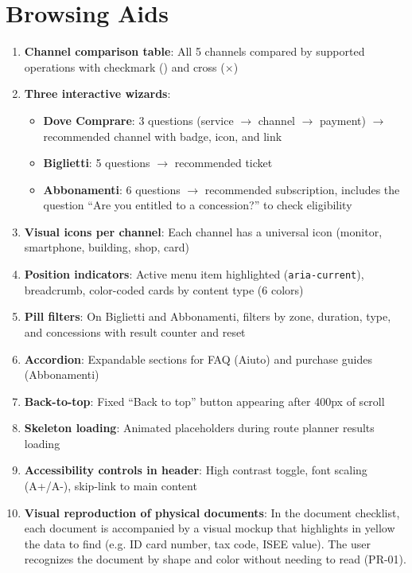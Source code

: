 ﻿\documentclass[11pt,a4paper]{article}
\begin{document}
\section{Browsing Aids}

\begin{tcolorbox}[rffield]
\small
\begin{enumerate}[nosep,leftmargin=*]
  \item \textbf{Channel comparison table}: All 5 channels compared by supported operations with checkmark (\checkmark) and cross ($\times$)
  \item \textbf{Three interactive wizards}: 
    \begin{itemize}[nosep]
      \item \textbf{Dove Comprare}: 3 questions (service $\rightarrow$ channel $\rightarrow$ payment) $\rightarrow$ recommended channel with badge, icon, and link
      \item \textbf{Biglietti}: 5 questions $\rightarrow$ recommended ticket
      \item \textbf{Abbonamenti}: 6 questions $\rightarrow$ recommended subscription, includes the question ``Are you entitled to a concession?'' to check eligibility
    \end{itemize}
  \item \textbf{Visual icons per channel}: Each channel has a universal icon (monitor, smartphone, building, shop, card)
  \item \textbf{Position indicators}: Active menu item highlighted (\texttt{aria-current}), breadcrumb, color-coded cards by content type (6 colors)
  \item \textbf{Pill filters}: On Biglietti and Abbonamenti, filters by zone, duration, type, and concessions with result counter and reset
  \item \textbf{Accordion}: Expandable sections for FAQ (Aiuto) and purchase guides (Abbonamenti)
  \item \textbf{Back-to-top}: Fixed ``Back to top'' button appearing after 400px of scroll
  \item \textbf{Skeleton loading}: Animated placeholders during route planner results loading
  \item \textbf{Accessibility controls in header}: High contrast toggle, font scaling (A+/A-), skip-link to main content
  \item \textbf{Visual reproduction of physical documents}: In the document checklist, each document is accompanied by a visual mockup that highlights in yellow the data to find (e.g. ID card number, tax code, ISEE value). The user recognizes the document by shape and color without needing to read (PR-01).

\end{enumerate}
\end{tcolorbox}
\end{document}
